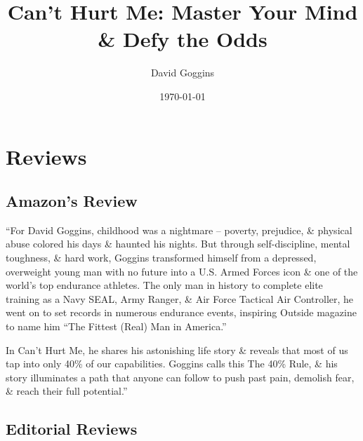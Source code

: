 \documentclass{article}
\title{Can't Hurt Me: Master Your Mind \& Defy the Odds}
\author{David Goggins}
\date{\today}
\numberwithin{equation}{section}
\begin{document}
\maketitle
\tableofcontents


\section{Reviews}

\subsection{Amazon's Review}
``For David Goggins, childhood was a nightmare -- poverty, prejudice, \& physical abuse colored his days \& haunted his nights. But through self-discipline, mental toughness, \& hard work, Goggins transformed himself from a depressed, overweight young man with no future into a U.S. Armed Forces icon \& one of the world's top endurance athletes. The only man in history to complete elite training as a Navy SEAL, Army Ranger, \& Air Force Tactical Air Controller, he went on to set records in numerous endurance events, inspiring Outside magazine to name him ``The Fittest (Real) Man in America.''

In Can't Hurt Me, he shares his astonishing life story \& reveals that most of us tap into only 40\% of our capabilities. Goggins calls this The 40\% Rule, \& his story illuminates a path that anyone can follow to push past pain, demolish fear, \& reach their full potential.''

\subsection{Editorial Reviews}
\end{document}
